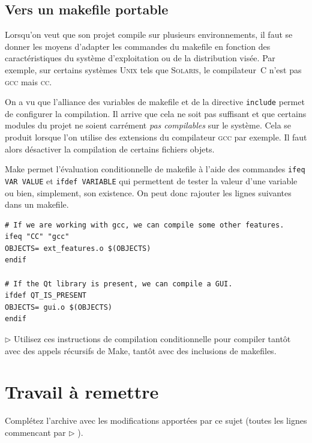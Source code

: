 \documentclass[11pt,a4paper]{article}
\newcommand{\must}{\noindent $\triangleright$ \xspace}
\begin{document}
\subsection{Vers un makefile portable}

Lorsqu'on veut que son projet compile sur plusieurs environnements, il
faut se donner les moyens d'adapter les commandes du makefile en
fonction des caractéristiques du système d'exploitation ou de la
distribution visée. Par exemple, sur certains systèmes \textsc{Unix}
tels que \textsc{Solaris}, le compilateur~C n'est pas \textsc{gcc}
mais \textsc{cc}.

On a vu que l'alliance des variables de makefile et de la directive
\texttt{include} permet de configurer la compilation. Il arrive que
cela ne soit pas suffisant et que certains modules du projet ne soient
carrément \emph{pas compilables} sur le système. Cela se produit
lorsque l'on utilise des extensions du compilateur \textsc{gcc} par
exemple. Il faut alors désactiver la compilation de certains fichiers
objets.

\textsf{Make} permet l'évaluation conditionnelle de makefile
à l'aide des commandes \texttt{\small ifeq VAR VALUE} et
\texttt{\small ifdef VARIABLE} qui permettent de tester la valeur
d'une variable ou bien, simplement, son existence. On peut donc
rajouter les lignes suivantes dans un makefile.
{\small
\begin{verbatim}
# If we are working with gcc, we can compile some other features.
ifeq "CC" "gcc"
OBJECTS= ext_features.o $(OBJECTS)
endif

# If the Qt library is present, we can compile a GUI.
ifdef QT_IS_PRESENT
OBJECTS= gui.o $(OBJECTS)
endif
\end{verbatim}
}

\must Utilisez ces instructions de compilation conditionnelle pour
compiler tantôt avec des appels récursifs de \textsf{Make}, tantôt
avec des inclusions de makefiles.

\section{Travail à remettre}

\noindent Complétez l'archive avec les modifications apportées par ce
sujet (toutes les lignes commencant par \must).


\end{document}
